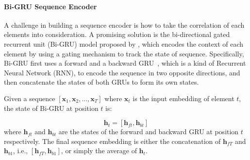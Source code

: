 \paragraph{Bi-GRU Sequence Encoder} 
A challenge in building a sequence encoder is how to take the correlation of each elements into consideration. A promising solution is the bi-directional gated recurrent unit (Bi-GRU) model proposed by \cite{bahdanau2015neural}, which encodes the context of each element by using a gating mechanism to track the state of sequence.
Specifically, Bi-GRU first uses a forward and a backward GRU~\cite{cho2014learning}, which is a kind of Recurrent Neural Network (RNN), to encode the sequence in two opposite directions, and then concatenate the states of both GRUs to form its own states. 

Given a sequence $[\mathbf{x}_1, \mathbf{x}_2, ..., \mathbf{x}_T]$ where $\mathbf{x}_t$ is the input embedding of element $t$, the state of Bi-GRU at position $t$ is:

\begin{equation}
\mathbf{h}_t = [\mathbf{h}_{ft}, \mathbf{h}_{bt}]
\end{equation}
where $\mathbf{h}_{ft}$ and $\mathbf{h}_{bt}$ are the states of the forward and backward GRU at position $t$ respectively. The final sequence embedding is either the concatenation of $\mathbf{h}_{fT}$ and $\mathbf{h}_{b1}$, i.e., $[\mathbf{h}_{fT}, \mathbf{h}_{b1}]$, or simply the average of $\mathbf{h}_t$.





